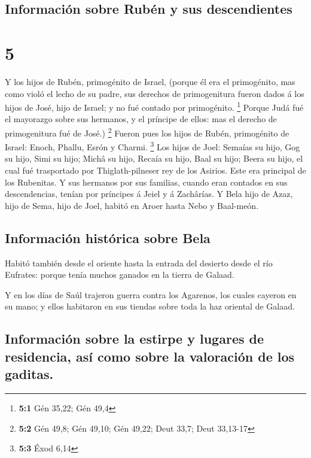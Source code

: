 \hypertarget{informaciuxf3n-sobre-rubuxe9n-y-sus-descendientes}{%
\subsection{Información sobre Rubén y sus
descendientes}\label{informaciuxf3n-sobre-rubuxe9n-y-sus-descendientes}}

\hypertarget{section-4}{%
\section{5}\label{section-4}}

 Y los hijos de Rubén, primogénito de Israel, (porque él
era el primogénito, mas como violó el lecho de su padre, sus derechos de
primogenitura fueron dados á los hijos de José, hijo de Israel; y no fué
contado por primogénito. \footnote{\textbf{5:1} Gén 35,22; Gén 49,4}
 Porque Judá fué el mayorazgo sobre sus hermanos, y el
príncipe de ellos: mas el derecho de primogenitura fué de José.)
\footnote{\textbf{5:2} Gén 49,8; Gén 49,10; Gén 49,22; Deut 33,7; Deut
  33,13-17}  Fueron pues los hijos de Rubén, primogénito
de Israel: Enoch, Phallu, Esrón y Charmi. \footnote{\textbf{5:3} Éxod
  6,14}  Los hijos de Joel: Semaías su hijo, Gog su hijo,
Simi su hijo;  Michâ su hijo, Recaía su hijo, Baal su
hijo;  Beera su hijo, el cual fué trasportado por
Thiglath-pilneser rey de los Asirios. Este era principal de los
Rubenitas.  Y sus hermanos por sus familias, cuando eran
contados en sus descendencias, tenían por príncipes á Jeiel y á
Zachârías.  Y Bela hijo de Azaz, hijo de Sema, hijo de
Joel, habitó en Aroer hasta Nebo y Baal-meón.

\hypertarget{informaciuxf3n-histuxf3rica-sobre-bela}{%
\subsection{Información histórica sobre
Bela}\label{informaciuxf3n-histuxf3rica-sobre-bela}}

 Habitó también desde el oriente hasta la entrada del
desierto desde el río Eufrates: porque tenía muchos ganados en la tierra
de Galaad.

 Y en los días de Saúl trajeron guerra contra los
Agarenos, los cuales cayeron en su mano; y ellos habitaron en sus
tiendas sobre toda la haz oriental de Galaad.

\hypertarget{informaciuxf3n-sobre-la-estirpe-y-lugares-de-residencia-asuxed-como-sobre-la-valoraciuxf3n-de-los-gaditas.}{%
\subsection{Información sobre la estirpe y lugares de residencia, así
como sobre la valoración de los
gaditas.}\label{informaciuxf3n-sobre-la-estirpe-y-lugares-de-residencia-asuxed-como-sobre-la-valoraciuxf3n-de-los-gaditas.}}

